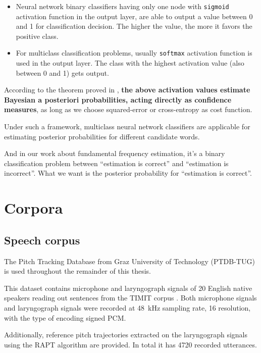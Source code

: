 \documentclass[11pt,a4paper]{report}
\begin{document}
\begin{itemize}
  \item Neural network binary classifiers having only one node with \texttt{sigmoid} activation function in the output layer, are able to output a value between 0 and 1 for classification decision.
    The higher the value, the more it favors the positive class.
  \item For multiclass classification problems, usually \texttt{softmax} activation function is used in the output layer.
    The class with the highest activation value (also between 0 and 1) gets output.
\end{itemize}

According to the theorem proved in \parencite{richard1991neural}, \textbf{the above activation values estimate Bayesian a posteriori probabilities, acting directly as confidence measures}, as long as we choose squared-error or cross-entropy as cost function.

\bigskip

Under such a framework, multiclass neural network classifiers are applicable for estimating posterior probabilities for different candidate words.

And in our work about fundamental frequency estimation, it's a binary classification problem between \enquote{estimation is correct} and \enquote{estimation is incorrect}.
What we want is the posterior probability for \enquote{estimation is correct}.

\chapter{Corpora}

\section{Speech corpus}

The Pitch Tracking Database from Graz University of Technology (PTDB-TUG) \parencite{pirker2011pitch} is used throughout the remainder of this thesis.

This dataset contains microphone and laryngograph signals of 20 English native speakers reading out sentences from the TIMIT corpus \parencite{garofolo1993darpa}.
Both microphone signals and laryngograph signals were recorded at \SI{48}{\kilo\hertz} sampling rate, \SI{16}{\bit} resolution, with the type of encoding signed PCM.

Additionally, reference pitch trajectories extracted on the laryngograph signals using the RAPT algorithm \parencite{talkin1995robust} are provided.
In total it has \num{4720} recorded utterances.
\end{document}
